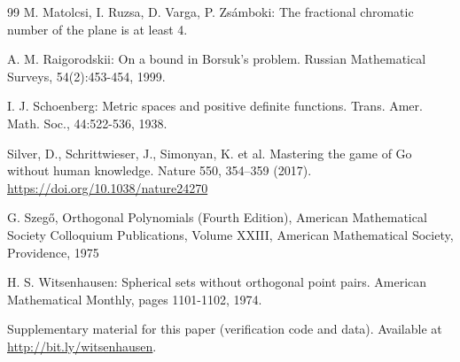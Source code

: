 \documentclass[11pt]{amsart}
\numberwithin{equation}{section}
\begin{document}
\begin{thebibliography}{99}
 M. Matolcsi, I. Ruzsa, D. Varga, P. Zsámboki: The fractional chromatic number of the plane is at least 4.

A. M. Raigorodskii: On a bound in Borsuk’s problem. Russian Mathematical Surveys, 54(2):453-454, 1999.

I. J. Schoenberg: Metric spaces and positive definite functions. Trans.
Amer. Math. Soc., 44:522-536, 1938.

Silver, D., Schrittwieser, J., Simonyan, K. et al. Mastering the game of Go without human knowledge. Nature 550, 354–359 (2017). \url{https://doi.org/10.1038/nature24270}

G. Szeg\H o, Orthogonal Polynomials (Fourth Edition), American Mathematical Society Colloquium Publications, Volume XXIII, American Mathematical Society, Providence, 1975

H. S. Witsenhausen: Spherical sets without orthogonal point pairs.
American Mathematical Monthly, pages 1101-1102, 1974.

Supplementary material for this paper (verification code and data). 
Available at \url{http://bit.ly/witsenhausen}.
 
\end{thebibliography}

\clearpage
\end{document}
